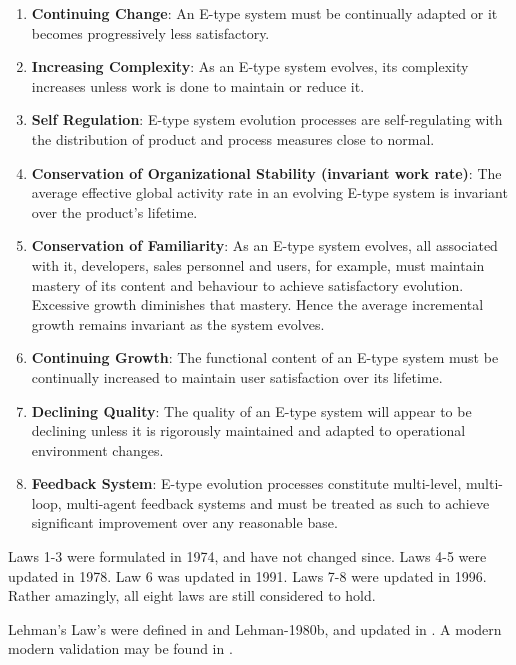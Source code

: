 \begin{appendices}
\begin{enumerate}
\item \textbf{Continuing Change}: An E-type system must be continually adapted or it becomes progressively less satisfactory.
\item \textbf{Increasing Complexity}: As an E-type system evolves, its complexity increases unless work is done to maintain or reduce it.
\item \textbf{Self Regulation}: E-type system evolution processes are self-regulating with the distribution of product and process measures close to normal.
\item \textbf{Conservation of Organizational Stability (invariant work rate)}: The average effective global activity rate in an evolving E-type system is invariant over the product's lifetime.
\item \textbf{Conservation of Familiarity}: As an E-type system evolves, all associated with it, developers, sales personnel and users, for example, must maintain mastery of its content and behaviour to achieve satisfactory evolution. Excessive growth diminishes that mastery. Hence the average incremental growth remains invariant as the system evolves.
\item \textbf{Continuing Growth}: The functional content of an E-type system must be continually increased to maintain user satisfaction over its lifetime.
\item \textbf{Declining Quality}: The quality of an E-type system will appear to be declining unless it is rigorously maintained and adapted to operational environment changes.
\item \textbf{Feedback System}: E-type evolution processes constitute multi-level, multi-loop, multi-agent feedback systems and must be treated as such to achieve significant improvement over any reasonable base.
\end{enumerate}

Laws 1-3 were formulated in 1974, and have not changed since. Laws 4-5 were updated in 1978. Law 6 was updated in 1991. Laws 7-8 were updated in 1996. Rather amazingly, all eight laws are still considered to hold.

Lehman's Law's were defined in \cite{Lehman-1980a} and {Lehman-1980b}, and updated in \cite{Lehman-1997}. A modern modern validation may be found in \cite{Yu-2013}.

\end{appendices}

\newpage
\thispagestyle{empty}
